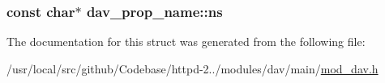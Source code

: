 \subsubsection[{\texorpdfstring{ns}{ns}}]{\setlength{\rightskip}{0pt plus 5cm}const char$\ast$ dav\+\_\+prop\+\_\+name\+::ns}\hypertarget{structdav__prop__name_ac32f7eed5e8b6b8fd7f193b253b036dc}{}\label{structdav__prop__name_ac32f7eed5e8b6b8fd7f193b253b036dc}


The documentation for this struct was generated from the following file\+:\begin{DoxyCompactItemize}
\item 
/usr/local/src/github/\+Codebase/httpd-\/2../modules/dav/main/\hyperlink{mod__dav_8h}{mod\+\_\+dav.\+h}\end{DoxyCompactItemize}
